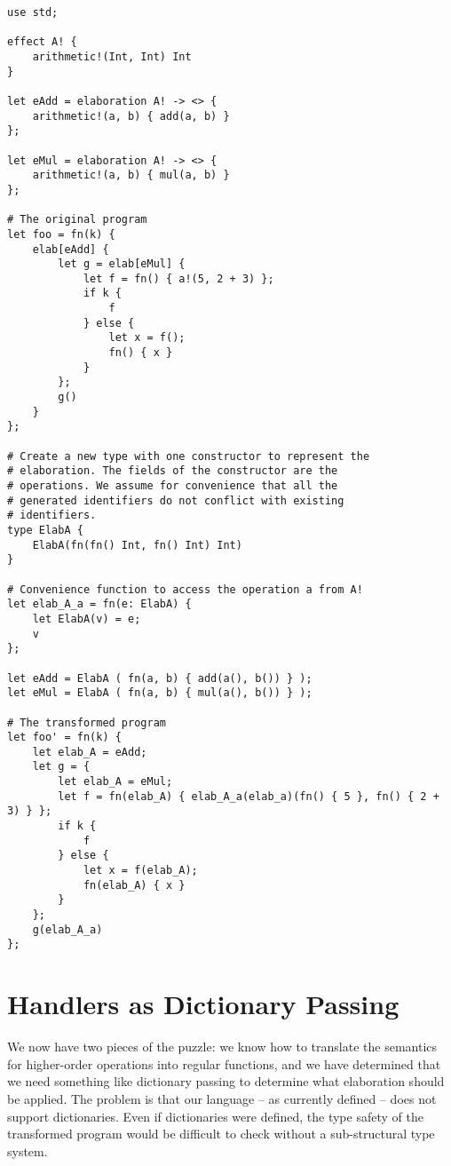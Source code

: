 \begin{lstlisting}[language=elaine,style=fancy,float=p,caption={\fixme{Some explanation. Should be higher-order?}}]
use std;

effect A! {
    arithmetic!(Int, Int) Int
}

let eAdd = elaboration A! -> <> {
    arithmetic!(a, b) { add(a, b) }
};

let eMul = elaboration A! -> <> {
    arithmetic!(a, b) { mul(a, b) }
};

# The original program
let foo = fn(k) {
    elab[eAdd] {
        let g = elab[eMul] {
            let f = fn() { a!(5, 2 + 3) };
            if k {
                f
            } else {
                let x = f();
                fn() { x }
            }
        };
        g()
    }
};

# Create a new type with one constructor to represent the
# elaboration. The fields of the constructor are the 
# operations. We assume for convenience that all the
# generated identifiers do not conflict with existing
# identifiers.
type ElabA {
    ElabA(fn(fn() Int, fn() Int) Int)
}

# Convenience function to access the operation a from A!
let elab_A_a = fn(e: ElabA) {
    let ElabA(v) = e;
    v
};

let eAdd = ElabA ( fn(a, b) { add(a(), b()) } );
let eMul = ElabA ( fn(a, b) { mul(a(), b()) } );

# The transformed program
let foo' = fn(k) {
    let elab_A = eAdd;
    let g = {
        let elab_A = eMul;
        let f = fn(elab_A) { elab_A_a(elab_a)(fn() { 5 }, fn() { 2 + 3) } };
        if k {
            f
        } else {
            let x = f(elab_A);
            fn(elab_A) { x }
        }
    };
    g(elab_A_a)
};
\end{lstlisting}

\section{Handlers as Dictionary Passing}

We now have two pieces of the puzzle: we know how to translate the semantics for higher-order operations into regular functions, and we have determined that we need something like dictionary passing to determine what elaboration should be applied. The problem is that our language -- as currently defined -- does not support dictionaries. Even if dictionaries were defined, the type safety of the transformed program would be difficult to check without a sub-structural type system.


